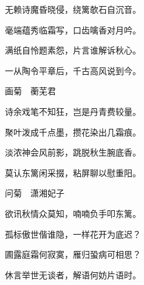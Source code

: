 \begin{poem}
\begin{pl}
        无赖诗魔昏晓侵，绕篱欹石自沉音。
    \end{pl}
    \begin{pl}

        毫端蕴秀临霜写，口齿噙香对月吟。
    \end{pl}
    \begin{pl}

        满纸自怜题素怨，片言谁解诉秋心。
    \end{pl}
    \begin{pl}

        一从陶令平章后，千古高风说到今。
    \end{pl}
    \emptypl

    \begin{pl}

        画菊　蘅芜君
    \end{pl}
    \begin{pl}

        诗余戏笔不知狂，岂是丹青费较量。
    \end{pl}
    \begin{pl}

        聚叶泼成千点墨，攒花染出几霜痕。
    \end{pl}
    \begin{pl}

        淡浓神会风前影，跳脱秋生腕底香。
    \end{pl}
    \begin{pl}

        莫认东篱闲采掇，粘屏聊以慰重阳。
    \end{pl}
    \emptypl

    \begin{pl}

        问菊　潇湘妃子
    \end{pl}
    \begin{pl}

        欲讯秋情众莫知，喃喃负手叩东篱。
    \end{pl}
    \begin{pl}

        孤标傲世偕谁隐，一样花开为底迟？
    \end{pl}
    \begin{pl}

        圃露庭霜何寂寞，雁归蛩病可相思？
    \end{pl}
    \begin{pl}

        休言举世无谈者，解语何妨片语时。
    \end{pl}
    \emptypl


\end{poem}
